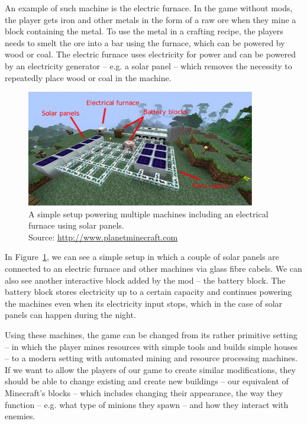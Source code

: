 An example of such machine is the electric furnace. In the game without mods, the player gets iron and other metals in the form
of a raw ore when they mine a block containing the metal. To use the metal in a crafting recipe, the players needs to smelt the ore
into a bar using the furnace, which can be powered by wood or coal. The electric furnace uses electricity for power and can be
powered by an electricity generator -- e.g. a solar panel -- which removes the necessity to repeatedly place wood or coal in
the machine.

\begin{figure}[h]
    \centering
    \includegraphics[width=10cm]{../img/ic-solar.pdf}
    \caption{A simple setup powering multiple machines including an electrical furnace using solar panels.
             \\Source: \href{http://static.planetminecraft.com/files/resource\_media/screenshot/1246/javaw-2012-11-12-20-51-09-46\_4122139.jpg}{http://www.planetminecraft.com}}
    \label{ic-solar}
\end{figure}

In Figure~\ref{ic-solar}, we can see a simple setup in which a couple of solar panels are connected to an electric furnace and other
machines via glass fibre cabels. We can also see another interactive block added by the mod -- the battery block. The battery block
stores electricity up to a certain capacity and continues powering the machines even when its electricity input stops, which in the
case of solar panels can happen during the night.

Using these machines, the game can be changed from its rather primitive setting -- in which the player mines resources with simple
tools and builds simple houses -- to a modern setting with automated mining and resource processing machines. If we want to allow
the players of our game to create similar modifications, they should be able to change existing and create new buildings -- our equivalent of 
Minecraft's blocks -- which includes changing their appearance, the way they function -- e.g. what type of minions they spawn -- and
how they interact with enemies.

